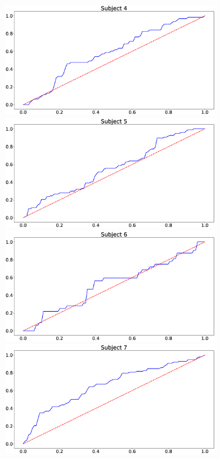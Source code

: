 \documentclass[journal]{IEEEtran}
\begin{document}
{{\begin{figure}[h!]
\begin{subfigure}{0.5\textwidth}
 \includegraphics[scale=0.09]{revisedimages/roc_4.eps} \\
 \centering
  \includegraphics[scale=0.09]{revisedimages/roc_5.eps}   \hspace{-1.5em}
  \includegraphics[scale=0.09]{revisedimages/roc_6.eps} \\
  \centering
  \includegraphics[scale=0.09]{revisedimages/roc_7.eps}    \hspace{-1.5em}

\end{subfigure}
\end{figure}}}
\end{document}
